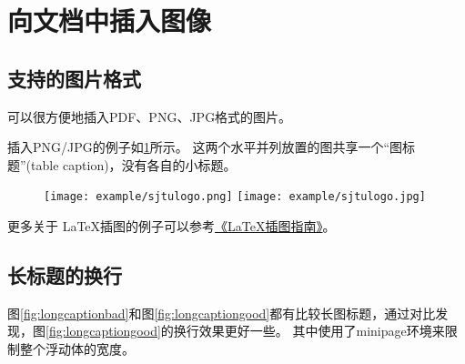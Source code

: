 \section{向文档中插入图像}
\label{sec:insertimage}

\subsection{支持的图片格式}
\label{sec:imageformat}

\XeTeX 可以很方便地插入PDF、PNG、JPG格式的图片。

插入PNG/JPG的例子如\ref{fig:SRR}所示。
这两个水平并列放置的图共享一个“图标题”(table caption)，没有各自的小标题。

\begin{figure}[!htp]
  \centering
  \texttt{[image: example/sjtulogo.png]}
  \hspace{1cm}
  \texttt{[image: example/sjtulogo.jpg]}
  \label{fig:SRR}
\end{figure}

% 

更多关于 \LaTeX 插图的例子可以参考\href{http://www.cs.duke.edu/junhu/Graphics3.pdf}{《\LaTeX 插图指南》}。

\subsection{长标题的换行}
\label{sec:longcaption}

图\ref{fig:longcaptionbad}和图\ref{fig:longcaptiongood}都有比较长图标题，通过对比发现，图\ref{fig:longcaptiongood}的换行效果更好一些。
其中使用了minipage环境来限制整个浮动体的宽度。

